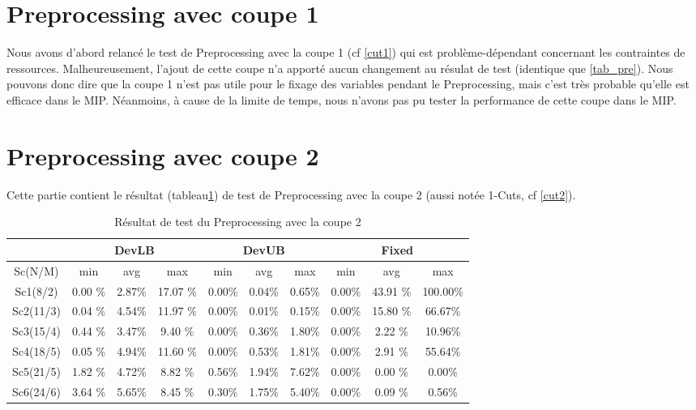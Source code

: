\documentclass[twoside,fleqn]{EPURapport}
\begin{document}
\section{Preprocessing avec coupe 1}
Nous avons d'abord relancé le test de Preprocessing avec la coupe 1 (cf \ref{cut1}) qui est problème-dépendant concernant les contraintes de ressources. Malheureusement, l'ajout de cette coupe n'a apporté aucun changement au résulat de test (identique que \ref{tab_pre}). Nous pouvons donc dire que la coupe 1 n'est pas utile pour le fixage des variables pendant le Preprocessing, mais c'est très probable qu'elle est efficace dans le MIP. Néanmoins, à cause de la limite de temps, nous n'avons pas pu tester la performance de cette coupe dans le MIP.


\section{Preprocessing avec coupe 2}
Cette partie contient le résultat (tableau\ref{tab_pre_2}) de test de Preprocessing avec la coupe 2 (aussi notée 1-Cuts, cf \ref{cut2}).
\begin{table}[h]
    \centering
    \begin{tabular}{|c|c|c|c|c|c|c|c|c|c|}
    	\hline
&\multicolumn{3}{c|}{DevLB}& \multicolumn{3}{c|}{DevUB}& \multicolumn{3}{c|}{Fixed} 	\\ \hline
    	Sc(N/M)	& min & avg & max & min & avg & max & min & avg & max\\ \hline
Sc1(8/2) & 0.00 \% &	2.87\%  &	17.07	\%  &0.00\% & 0.04\%  &0.65\%  &0.00\%  &43.91	\% &100.00\% \\ \hline
Sc2(11/3)& 0.04 \% & 	4.54\% & 	11.97	\% & 0.00\%&  0.01\% & 0.15\% & 0.00\%  &15.80	\% &66.67\%\\ \hline
Sc3(15/4)& 0.44 \% & 	3.47\% & 	9.40	\% & 0.00\%&  0.36\% & 1.80\% & 0.00\%  &2.22	\% &10.96\%\\ \hline
Sc4(18/5)& 0.05 \% & 	4.94\% & 	11.60	\% & 0.00\%&  0.53\% & 1.81\% & 0.00\%  &2.91	\% &55.64\%\\ \hline
Sc5(21/5)& 1.82 \% & 	4.72\% & 	8.82	\%  &0.56\% & 1.94\%  &7.62\%  &0.00\%  &0.00	\% &0.00\%\\ \hline
Sc6(24/6)& 3.64 \% & 	5.65\% & 	8.45	\%  &0.30\% & 1.75\%  &5.40\%  &0.00\%  &0.09	\% &0.56\%\\ \hline 
    \end{tabular}
    \caption{Résultat de test du Preprocessing avec la coupe 2}
    \label{tab_pre_2}
\end{table}
\bigskip
\end{document}
